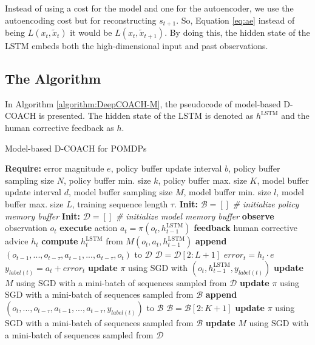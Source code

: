 Instead of using a cost for the model and one for the autoencoder, we use the autoencoding cost but for reconstructing $s_{t+1}$. So, Equation \ref{eq:ae} instead of being $L(x_{t},\widetilde x_{t})$ it would be  $L(x_{t},\widetilde x_{t+1})$. By doing this, the hidden state of the LSTM embeds both the high-dimensional input and past observations.
\newpage

\subsection{The Algorithm}

In Algorithm \ref{algorithm:DeepCOACH-M}, the pseudocode of model-based D-COACH is presented. The hidden state of the LSTM is denoted as  $h^{\mathrm{LSTM}}$ and the human corrective feedback as  $h$.

\begin{algorithm}[h]
\caption{Model-based D-COACH for POMDPs}\label{algorithm:DeepCOACH-M}
\begin{algorithmic}[1]
\State \textbf{Require:} error magnitude $e$, policy buffer update interval $b$, policy buffer sampling size $N$, policy buffer min. size $k$, policy buffer max. size $K$, model buffer update interval $d$, model buffer sampling size $M$, model buffer min. size $l$, model buffer max. size $L$, training sequence length $\tau$.
\State \textbf{Init:} $\mathcal{B} = []$  \emph{\# initialize policy memory buffer}
\State \textbf{Init:} $\mathcal{D} = []$  \emph{\# initialize model memory buffer}
\State \textbf{observe} observation $o_{t}$
\State \textbf{execute} action $a_{t}=\pi(o_{t}, h^{\mathrm{LSTM}}_{t-1})$
\State \textbf{feedback} human corrective advice $h_{t}$
\State \textbf{compute} $h^{\mathrm{LSTM}}_{t}$ from $M(o_{t}, a_{t},h^{\mathrm{LSTM}}_{t-1})$
\State \textbf{append} $(o_{t-1},...,o_{t-\tau},a_{t-1},...,a_{t-\tau},o_{t})$ to $\mathcal{D}$
\State $\mathcal{D} = \mathcal{D}[2:L+1]$
\EndIf
{}
\State $\mathit{error}_{t} = h_{t}\cdot e$
\State $y_{label(t)} = a_{t} + \mathit{error}_{t}$ 
\State \textbf{update} $\pi$ using SGD with $(o_{t}, h^{\mathrm{LSTM}}_{t-1}, y_{\mathit{label}(t)})$ 
\State \textbf{update} $M$ using SGD with a mini-batch of sequences sampled from $\mathcal{D}$
\State \textbf{update} $\pi$ using SGD with a mini-batch of sequences sampled from $\mathcal{B}$
\State \textbf{append} $(o_{t},...,o_{t-\tau},a_{t-1},...,a_{t-\tau}, y_{\mathit{label}(t)})$ to $\mathcal{B}$
\State $\mathcal{B} = \mathcal{B}[2:K+1]$
\EndIf
\EndIf
{}
\State \textbf{update} $\pi$ using SGD with a mini-batch of sequences sampled from $\mathcal{B}$
\EndIf
{}
\State \textbf{update} $M$ using SGD with a mini-batch of sequences sampled from $\mathcal{D}$
\EndIf
\EndFor
\end{algorithmic}
\end{algorithm}


